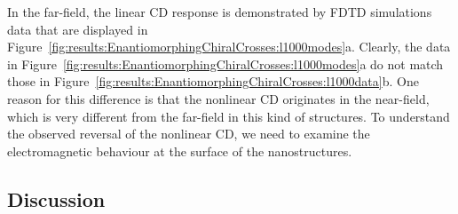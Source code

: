 In the far-field, the linear CD response is demonstrated by FDTD simulations data that are displayed in Figure~\ref{fig:results:EnantiomorphingChiralCrosses:l1000modes}a. Clearly, the data in Figure~\ref{fig:results:EnantiomorphingChiralCrosses:l1000modes}a do not match those in Figure~\ref{fig:results:EnantiomorphingChiralCrosses:l1000data}b. One reason for this difference is that the nonlinear CD originates in the near-field, which is very different from the far-field in this kind of structures. To understand the observed reversal of the nonlinear CD, we need to examine the electromagnetic behaviour at the surface of the nanostructures. 

\subsection{Discussion}\label{sec:results:EnantiomorphingChiralCrosses:discussion}

